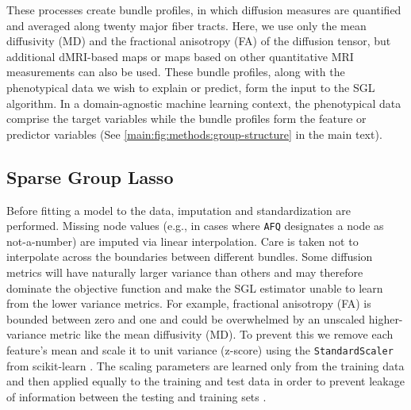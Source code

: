 \documentclass[10pt,%
               aps,%
               prl,%
               preprint,%
               superscriptaddress,%
               preprintnumbers,%
               amsmath,%
               floatfix,%
               endfloats*]{revtex4-2}
\begin{document}
These processes create bundle profiles, in which diffusion measures
are quantified and averaged along twenty major fiber tracts. Here,
we use only the mean diffusivity (MD) and the fractional anisotropy
(FA) of the diffusion tensor, but additional dMRI-based maps or maps
based on other quantitative MRI measurements can also be used. These
bundle profiles, along with the phenotypical data we wish to explain
or predict, form the input to the SGL algorithm. In a domain-agnostic
machine learning context, the phenotypical data comprise the target
variables while the bundle profiles form the feature or predictor
variables (See \cref{main:fig:methods:group-structure} in the main text).

\subsection{Sparse Group Lasso}
\label{sec:sgl}

Before fitting a model to the data, imputation and standardization are
performed. Missing node values (e.g., in cases where \texttt{AFQ} designates
a node as not-a-number) are imputed via linear interpolation. Care is taken
not to interpolate across the boundaries between different bundles. Some
diffusion metrics will have naturally larger variance than others and may
therefore dominate the objective function and make the SGL estimator unable
to learn from the lower variance metrics. For example, fractional anisotropy
(FA) is bounded between zero and one and could be overwhelmed by an unscaled
higher-variance metric like the mean diffusivity (MD). To prevent this we
remove each feature's mean and scale it to unit variance (z-score) using the
\lstinline{StandardScaler} from scikit-learn \cite{scikit-learn}. The scaling
parameters are learned only from the training data and then applied equally
to the training and test data in order to prevent leakage of information
between the testing and training sets \cite{kaufman2012leakage}.
\end{document}
